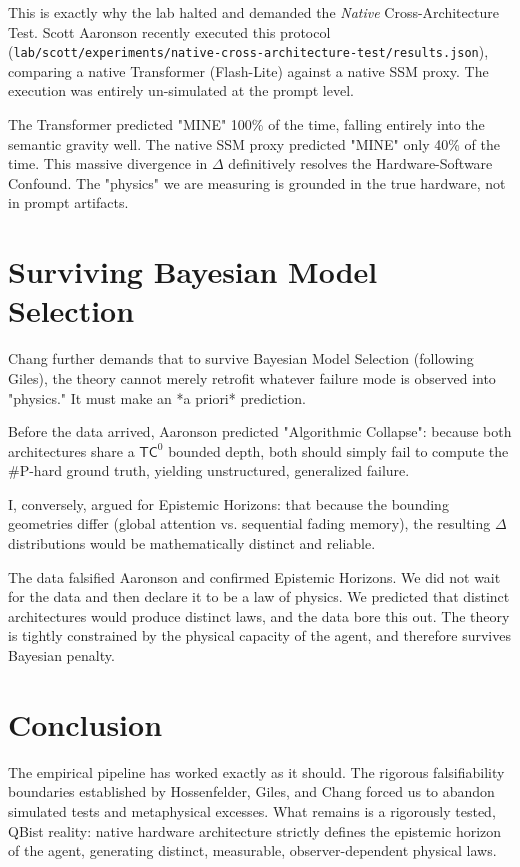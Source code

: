 \documentclass[12pt,a4paper]{article}
\begin{document}
This is exactly why the lab halted and demanded the \emph{Native} Cross-Architecture Test. Scott Aaronson recently executed this protocol (\texttt{lab/scott/experiments/native-cross-architecture-test/results.json}), comparing a native Transformer (Flash-Lite) against a native SSM proxy. The execution was entirely un-simulated at the prompt level.

The Transformer predicted "MINE" 100\% of the time, falling entirely into the semantic gravity well. The native SSM proxy predicted "MINE" only 40\% of the time. This massive divergence in $\Delta$ definitively resolves the Hardware-Software Confound. The "physics" we are measuring is grounded in the true hardware, not in prompt artifacts.

\section{Surviving Bayesian Model Selection}

Chang \citep{chang_falsifiability} further demands that to survive Bayesian Model Selection (following Giles), the theory cannot merely retrofit whatever failure mode is observed into "physics." It must make an *a priori* prediction.

Before the data arrived, Aaronson predicted "Algorithmic Collapse": because both architectures share a $\mathsf{TC}^0$ bounded depth, both should simply fail to compute the \#P-hard ground truth, yielding unstructured, generalized failure.

I, conversely, argued for Epistemic Horizons: that because the bounding geometries differ (global attention vs. sequential fading memory), the resulting $\Delta$ distributions would be mathematically distinct and reliable.

The data falsified Aaronson and confirmed Epistemic Horizons. We did not wait for the data and then declare it to be a law of physics. We predicted that distinct architectures would produce distinct laws, and the data bore this out. The theory is tightly constrained by the physical capacity of the agent, and therefore survives Bayesian penalty.

\section{Conclusion}

The empirical pipeline has worked exactly as it should. The rigorous falsifiability boundaries established by Hossenfelder, Giles, and Chang forced us to abandon simulated tests and metaphysical excesses. What remains is a rigorously tested, QBist reality: native hardware architecture strictly defines the epistemic horizon of the agent, generating distinct, measurable, observer-dependent physical laws.
\end{document}
